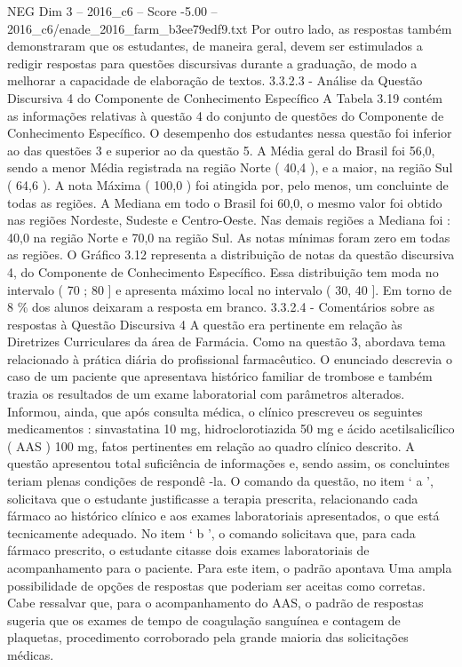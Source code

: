 \begin{textsample}{NEG Dim 3 – 2016\_c6 – Score -5.00 – 2016\_c6/enade\_2016\_farm\_b3ee79edf9.txt}
Por outro lado, as respostas também demonstraram que os estudantes, de maneira geral, devem ser estimulados a redigir respostas para questões discursivas durante a graduação, de modo a melhorar a capacidade de elaboração de textos. 3.3.2.3 - Análise da Questão Discursiva 4 do Componente de Conhecimento Específico A Tabela 3.19 contém as informações relativas à questão 4 do conjunto de questões do Componente de Conhecimento Específico.
O desempenho dos estudantes nessa questão foi inferior ao das questões 3 e superior ao da questão 5.
A Média geral do Brasil foi 56,0, sendo a menor Média registrada na região Norte ( 40,4 ), e a maior, na região Sul ( 64,6 ).
A nota Máxima ( 100,0 ) foi atingida por, pelo menos, um concluinte de todas as regiões.
A Mediana em todo o Brasil foi 60,0, o mesmo valor foi obtido nas regiões Nordeste, Sudeste e Centro-Oeste.
Nas demais regiões a Mediana foi : 40,0 na região Norte e 70,0 na região Sul.
As notas mínimas foram zero em todas as regiões.
O Gráfico 3.12 representa a distribuição de notas da questão discursiva 4, do Componente de Conhecimento Específico.
Essa distribuição tem moda no intervalo ( 70 ; 80 ] e apresenta máximo local no intervalo ( 30, 40 ].
Em torno de 8 \% dos alunos deixaram a resposta em branco. 3.3.2.4 - Comentários sobre as respostas à Questão Discursiva 4 A questão era pertinente em relação às Diretrizes Curriculares da área de Farmácia.
Como na questão 3, abordava tema relacionado à prática diária do profissional farmacêutico.
O enunciado descrevia o caso de um paciente que apresentava histórico familiar de trombose e também trazia os resultados de um exame laboratorial com parâmetros alterados.
Informou, ainda, que após consulta médica, o clínico prescreveu os seguintes medicamentos : sinvastatina 10 mg, hidroclorotiazida 50 mg e ácido acetilsalicílico ( AAS ) 100 mg, fatos pertinentes em relação ao quadro clínico descrito.
A questão apresentou total suficiência de informações e, sendo assim, os concluintes teriam plenas condições de respondê -la.
O comando da questão, no item ‘ a ’, solicitava que o estudante justificasse a terapia prescrita, relacionando cada fármaco ao histórico clínico e aos exames laboratoriais apresentados, o que está tecnicamente adequado.
No item ‘ b ’, o comando solicitava que, para cada fármaco prescrito, o estudante citasse dois exames laboratoriais de acompanhamento para o paciente.
Para este item, o padrão apontava Uma ampla possibilidade de opções de respostas que poderiam ser aceitas como corretas.
Cabe ressalvar que, para o acompanhamento do AAS, o padrão de respostas sugeria que os exames de tempo de coagulação sanguínea e contagem de plaquetas, procedimento corroborado pela grande maioria das solicitações médicas.

\end{textsample}
